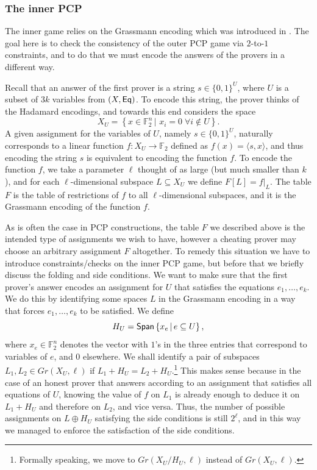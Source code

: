 \documentclass{toc}
\newcommand\Set[2]{ \left\{ #1 \,  \vert  \, #2\right\} }
\newcommand\spn{{\sf Span}}
\renewcommand\subset{\subseteq}
\def\F{\mathbb{F}}
\begin{document}
\subsubsection{The inner PCP}
The inner game relies on the Grassmann encoding which was introduced in \cite{KMS}.
The goal here is to check the consistency of the outer PCP game via $2$-to-$1$ constraints,
%
and to do that we must encode the answers of the provers in a different way.

Recall that an answer of the first prover is a string $s\in \{0,1\}^{U}$, where $U$ is a subset of $3k$ variables from
$(X,{\sf Eq})$. To encode this string, the prover thinks of the Hadamard encodings, and towards this end considers the space
\begin{equation}\label{eq:XU}
 X_U = \Set { x\in \F_2^n } {\, x_i=0 \;\forall i\not\in U}.
 \end{equation}
A given assignment for the variables of $U$, namely $s\in \{0,1\}^{U}$, naturally corresponds to a linear
function $f:X_U\to\F_2$ defined as $f(x) = \langle s, x\rangle$, and thus encoding the string $s$ is equivalent
to encoding the function $f$.
To encode the function $f$, we take a parameter $\ell$ thought of as large (but much smaller than $k$), and for each $\ell$-dimensional subspace $L\subset X_U$ we define $F[L] = f|_{L}$. The table $F$ is the table of restrictions of $f$ to all $\ell$-dimensional subspaces, and it is the
Grassmann encoding of the function $f$.



As is often the case in PCP constructions, the table $F$ we described above is the intended type of assignments we wish to have, however a cheating
prover may choose an arbitrary assignment $F$ altogether. To remedy this situation we have to introduce constraints/checks %
on the inner PCP game,
but before that we briefly discuss the folding and side conditions. We want to make sure that the first prover's answer encodes an assignment for $U$ that satisfies the equations $e_1,\ldots,e_k$. We do this by identifying some spaces $L$ in the Grassmann encoding in a way that forces $e_1,\ldots,e_k$ to be satisfied. We define
\[H_U = \spn\Set{x_{e}}{e\subset U},\]
where $x_e \in \F_2^n$ denotes the vector with $1$'s in the three entries that
correspond to variables of $e$, and $0$ elsewhere. We shall identify a pair of
subspaces $L_1,L_2\in Gr(X_U,\ell)$ if $L_1+H_U = L_2+H_U$.\footnote{Formally
  speaking, we move to $Gr(X_U/H_U,\ell)$ instead of $Gr(X_U,\ell)$.} This makes
sense because in the case of an honest prover that answers according to an
assignment that satisfies all equations of $U$, knowing the value of $f$ on $L_1$ is already enough to deduce it on $L_1+H_U $ and therefore on $L_2$, and vice versa. Thus, the number of possible assignments on $L\oplus H_U$ satisfying the side conditions is still $2^{\ell}$, and in this
way we managed to enforce the satisfaction of the side conditions.
\end{document}

